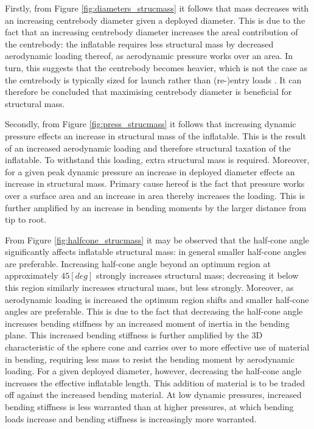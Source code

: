 Firstly, from Figure \ref{fig:diameters_strucmass} it follows that mass decreases with an increasing centrebody diameter given a deployed diameter. This is due to the fact that an increasing centrebody diameter increases the areal contribution of the centrebody: the inflatable requires less structural mass by decreased aerodynamic loading thereof, as aerodynamic pressure works over an area. In turn, this suggests that the centrebody becomes heavier, which is not the case as the centrebody is typically sized for launch rather than (re-)entry loads \cite{Lindell2006}. It can therefore be concluded that maximising centrebody diameter is beneficial for structural mass. 

Secondly, from Figure \ref{fig:press_strucmass} it follows that increasing dynamic pressure effects an increase in structural mass of the inflatable. This is the result of an increased aerodynamic loading and therefore structural taxation of the inflatable. To withstand this loading, extra structural mass is required. Moreover, for a given peak dynamic pressure an increase in deployed diameter effects an increase in structural mass. Primary cause hereof is the fact that pressure works over a surface area and an increase in area thereby increases the loading. This is further amplified by an increase in bending moments by the larger distance from tip to root.

From Figure \ref{fig:halfcone_strucmass} it may be observed that the half-cone angle significantly affects inflatable structural mass: in general smaller half-cone angles are preferable. Increasing half-cone angle beyond an optimum region at approximately $45 \left[deg\right]$ strongly increases structural mass; decreasing it below this region similarly increases structural mass, but less strongly. Moreover, as aerodynamic loading is increased the optimum region shifts and smaller half-cone angles are preferable. This is due to the fact that decreasing the half-cone angle increases bending stiffness by an increased moment of inertia in the bending plane. This increased bending stiffness is further amplified by the 3D characteristic of the sphere cone and carries over to more effective use of material in bending, requiring less mass to resist the bending moment by aerodynamic loading. For a given deployed diameter, however, decreasing the half-cone angle increases the effective inflatable length. This addition of material is to be traded off against the increased bending material. At low dynamic pressures, increased bending stiffness is less warranted than at higher pressures, at which bending loads increase and bending stiffness is increasingly more warranted.

